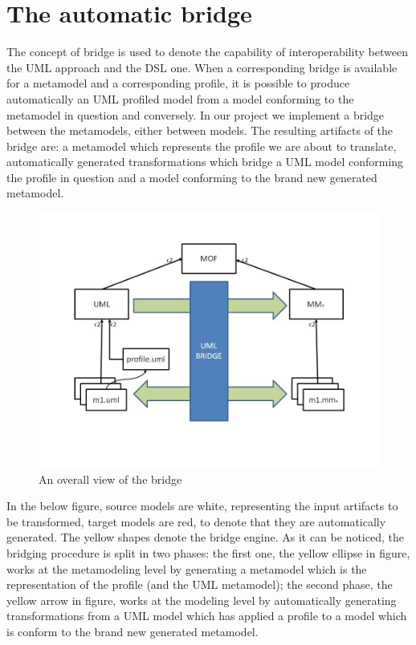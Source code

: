 \section{The automatic bridge}\label{sec:framework}


The concept of bridge is used to denote the capability of interoperability between the UML approach and the DSL one. When a corresponding bridge is available for a metamodel and a corresponding profile, it is possible to produce automatically an UML profiled model from a model conforming to the metamodel in question and conversely. In our project we implement a bridge between the metamodels, either between models. The resulting artifacts of the bridge are: a metamodel which represents the profile we are about to translate,  automatically generated transformations which bridge a UML model conforming the profile in question and a model conforming to the brand new generated metamodel.
\begin{figure}[htbp]
	\centering
		\includegraphics[width=1.00\textwidth]{figures/Diapositiva1.JPG}
	\caption{An overall view of the bridge}
	\label{fig:Diapositiva1}
\end{figure}
In the below figure,  source models are white, representing the input artifacts to be transformed, target models are red, to denote that they are automatically generated. The yellow shapes denote the bridge engine. As it can be noticed, the bridging procedure is split in two phases: the first one, the yellow ellipse in figure, works at the metamodeling level by generating a metamodel which is the representation of the profile (and the UML metamodel); the second phase, the yellow arrow in figure, works at the modeling level by automatically generating transformations from a UML model which has applied a profile to a model which is conform to the brand new generated metamodel.

